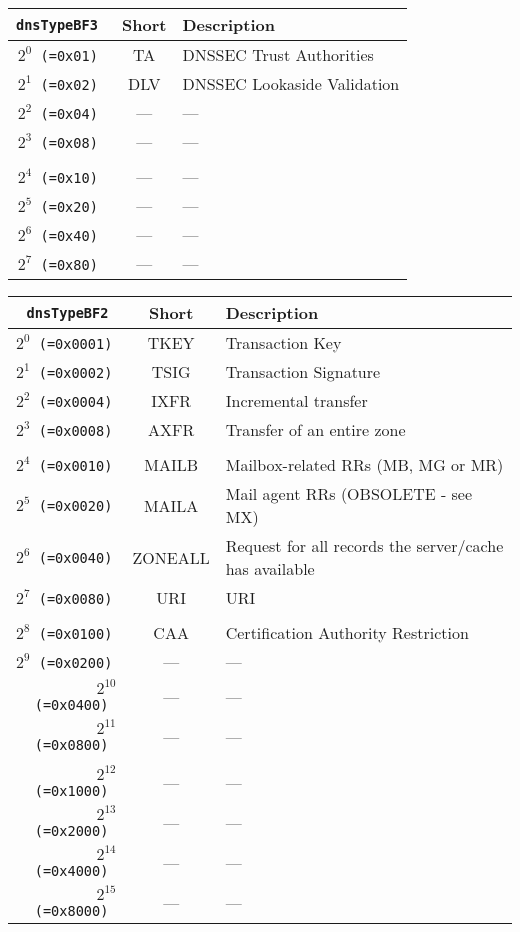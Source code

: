 \documentclass[documentation]{subfiles}
\begin{document}
\begin{longtable}{>{\tt}rcl}
    \toprule
    {\bf dnsTypeBF3} & {\bf Short} & {\bf Description}\\
    \midrule\endhead%
    $2^0$ (=0x01)    & TA          & DNSSEC Trust Authorities \\
    $2^1$ (=0x02)    & DLV         & DNSSEC Lookaside Validation \\
    $2^2$ (=0x04)    & ---         & --- \\
    $2^3$ (=0x08)    & ---         & --- \\
    \\
    $2^4$ (=0x10)    & ---         & --- \\
    $2^5$ (=0x20)    & ---         & --- \\
    $2^6$ (=0x40)    & ---         & --- \\
    $2^7$ (=0x80)    & ---         & --- \\
    \bottomrule
\end{longtable}

\begin{longtable}{>{\tt}rcl}
    \toprule
    {\bf dnsTypeBF2}   & {\bf Short} & {\bf Description} \\
    \midrule\endhead%
    $2^{0}$  (=0x0001) & TKEY        & Transaction Key \\
    $2^{1}$  (=0x0002) & TSIG        & Transaction Signature \\
    $2^{2}$  (=0x0004) & IXFR        & Incremental transfer \\
    $2^{3}$  (=0x0008) & AXFR        & Transfer of an entire zone \\
    \\
    $2^{4}$  (=0x0010) & MAILB       & Mailbox-related RRs (MB, MG or MR) \\
    $2^{5}$  (=0x0020) & MAILA       & Mail agent RRs (OBSOLETE - see MX) \\
    $2^{6}$  (=0x0040) & ZONEALL     & Request for all records the server/cache has available \\
    $2^{7}$  (=0x0080) & URI         & URI \\
    \\
    $2^{8}$  (=0x0100) & CAA         & Certification Authority Restriction \\
    $2^{9}$  (=0x0200) & ---         & --- \\
    $2^{10}$ (=0x0400) & ---         & --- \\
    $2^{11}$ (=0x0800) & ---         & --- \\
    \\
    $2^{12}$ (=0x1000) & ---         & --- \\
    $2^{13}$ (=0x2000) & ---         & --- \\
    $2^{14}$ (=0x4000) & ---         & --- \\
    $2^{15}$ (=0x8000) & ---         & --- \\
    \bottomrule
\end{longtable}
\end{document}
